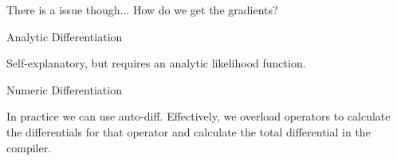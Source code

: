 \documentclass{article}
\begin{document}
There is a issue though... How do we get the gradients?

\itemize
\item Analytic Differentiation

Self-explanatory, but requires an analytic likelihood function.

\item Numeric Differentiation

In practice we can use auto-diff.  Effectively, we overload operators to calculate the differentials for that operator and calculate the total differential in the compiler.
\end{document}
